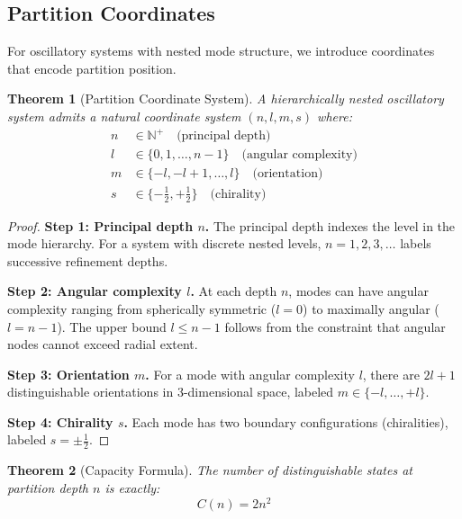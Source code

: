 \documentclass[twocolumn,10pt,a4paper]{article}
\newtheorem{theorem}{Theorem}[section]
\theoremstyle{definition}
\theoremstyle{remark}
\newcommand{\Natural}{\mathbb{N}}
\begin{document}
\subsection{Partition Coordinates}

For oscillatory systems with nested mode structure, we introduce coordinates that encode partition position.

\begin{theorem}[Partition Coordinate System]
\label{thm:coordinates}
A hierarchically nested oscillatory system admits a natural coordinate system $(n, l, m, s)$ where:
\begin{align}
    n &\in \Natural^+ \quad \text{(principal depth)} \\
    l &\in \{0, 1, \ldots, n-1\} \quad \text{(angular complexity)} \\
    m &\in \{-l, -l+1, \ldots, l\} \quad \text{(orientation)} \\
    s &\in \{-\tfrac{1}{2}, +\tfrac{1}{2}\} \quad \text{(chirality)}
\end{align}
\end{theorem}

\begin{proof}
\textbf{Step 1: Principal depth $n$.}
The principal depth indexes the level in the mode hierarchy. For a system with discrete nested levels, $n = 1, 2, 3, \ldots$ labels successive refinement depths.

\textbf{Step 2: Angular complexity $l$.}
At each depth $n$, modes can have angular complexity ranging from spherically symmetric ($l = 0$) to maximally angular ($l = n-1$). The upper bound $l \leq n-1$ follows from the constraint that angular nodes cannot exceed radial extent.

\textbf{Step 3: Orientation $m$.}
For a mode with angular complexity $l$, there are $2l + 1$ distinguishable orientations in 3-dimensional space, labeled $m \in \{-l, \ldots, +l\}$.

\textbf{Step 4: Chirality $s$.}
Each mode has two boundary configurations (chiralities), labeled $s = \pm\tfrac{1}{2}$.
\end{proof}

\begin{theorem}[Capacity Formula]
\label{thm:capacity}
The number of distinguishable states at partition depth $n$ is exactly:
\begin{equation}
    C(n) = 2n^2
\end{equation}
\end{theorem}
\end{document}
